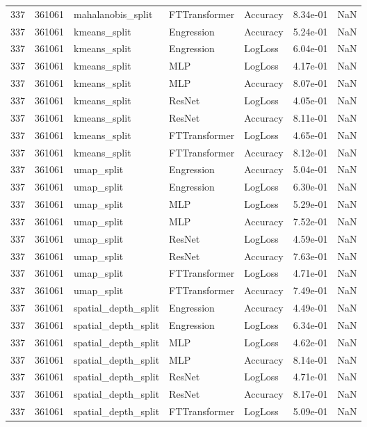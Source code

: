 \begin{tabular}{rrlllrr}
337 & 361061 & mahalanobis\_split & FTTransformer & Accuracy & 8.34e-01 & NaN \\
337 & 361061 & kmeans\_split & Engression & Accuracy & 5.24e-01 & NaN \\
337 & 361061 & kmeans\_split & Engression & LogLoss & 6.04e-01 & NaN \\
337 & 361061 & kmeans\_split & MLP & LogLoss & 4.17e-01 & NaN \\
337 & 361061 & kmeans\_split & MLP & Accuracy & 8.07e-01 & NaN \\
337 & 361061 & kmeans\_split & ResNet & LogLoss & 4.05e-01 & NaN \\
337 & 361061 & kmeans\_split & ResNet & Accuracy & 8.11e-01 & NaN \\
337 & 361061 & kmeans\_split & FTTransformer & LogLoss & 4.65e-01 & NaN \\
337 & 361061 & kmeans\_split & FTTransformer & Accuracy & 8.12e-01 & NaN \\
337 & 361061 & umap\_split & Engression & Accuracy & 5.04e-01 & NaN \\
337 & 361061 & umap\_split & Engression & LogLoss & 6.30e-01 & NaN \\
337 & 361061 & umap\_split & MLP & LogLoss & 5.29e-01 & NaN \\
337 & 361061 & umap\_split & MLP & Accuracy & 7.52e-01 & NaN \\
337 & 361061 & umap\_split & ResNet & LogLoss & 4.59e-01 & NaN \\
337 & 361061 & umap\_split & ResNet & Accuracy & 7.63e-01 & NaN \\
337 & 361061 & umap\_split & FTTransformer & LogLoss & 4.71e-01 & NaN \\
337 & 361061 & umap\_split & FTTransformer & Accuracy & 7.49e-01 & NaN \\
337 & 361061 & spatial\_depth\_split & Engression & Accuracy & 4.49e-01 & NaN \\
337 & 361061 & spatial\_depth\_split & Engression & LogLoss & 6.34e-01 & NaN \\
337 & 361061 & spatial\_depth\_split & MLP & LogLoss & 4.62e-01 & NaN \\
337 & 361061 & spatial\_depth\_split & MLP & Accuracy & 8.14e-01 & NaN \\
337 & 361061 & spatial\_depth\_split & ResNet & LogLoss & 4.71e-01 & NaN \\
337 & 361061 & spatial\_depth\_split & ResNet & Accuracy & 8.17e-01 & NaN \\
337 & 361061 & spatial\_depth\_split & FTTransformer & LogLoss & 5.09e-01 & NaN \\

\end{tabular}
